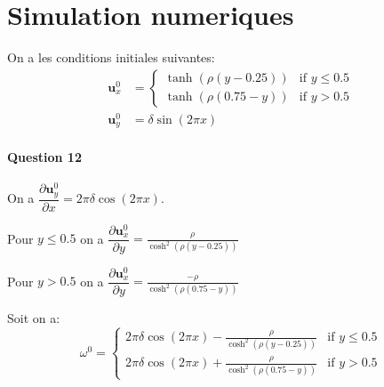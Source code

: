 \documentclass{article}
\newcommand{\pd}[2]{\dfrac{\partial#1}{\partial#2}}
\begin{document}
\section{Simulation numeriques}

On a les conditions initiales suivantes:
\begin{align*}
	\mathbf{u}_x^0 &= \begin{cases}
		\tanh\left(\rho(y-0.25)\right) & \text{if }y\leq 0.5 \\
		\tanh\left(\rho(0.75-y)\right) & \text{if }y > 0.5
	\end{cases} \\
	\mathbf{u}_y^0 &= \delta\sin(2\pi x)
\end{align*}

\paragraph{Question 12}
On a $\pd{\mathbf{u}_y^0}{x}=2\pi\delta\cos(2\pi x)$.

Pour $y \leq 0.5$ on a $\pd{\mathbf{u}_x^0}{y}=\frac{\rho}{\cosh^2(\rho(y-0.25))}$

Pour $y > 0.5$ on a $\pd{\mathbf{u}_x^0}{y}=\frac{-\rho}{\cosh^2(\rho(0.75-y))}$


Soit on a:
\begin{equation*}
	\omega^0 =
	\begin{cases}
		2\pi\delta\cos(2\pi x) - \frac{\rho}{\cosh^2(\rho(y-0.25))} & \text{if }y\leq 0.5 \\
		2\pi\delta\cos(2\pi x) + \frac{\rho}{\cosh^2(\rho(0.75-y))}  & \text{if }y > 0.5
	\end{cases}
\end{equation*}

\begin{appendix}
  \listoffigures
\end{appendix}
\end{document}
